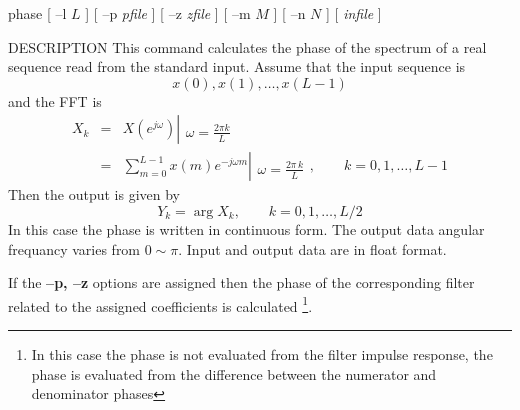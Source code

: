 
\begin{synopsis}
\item[phase] [ --l $L$ ] [ --p {\em pfile} ] [ --z {\em zfile} ]
             [ --m $M$ ] [ --n $N$ ] [ {\em infile} ]
\end{synopsis}

\begin{qsection}{DESCRIPTION}
This command calculates the phase of the spectrum of a real sequence read
from the standard input.
Assume that the input sequence is
\begin{displaymath}
  x(0), x(1), \ldots, x(L-1)
\end{displaymath}
and the FFT is
\begin{eqnarray*}
  X_k &=& X(e^{j\omega}) \left|
	\begin{array}{c}
	\\
        \omega=\frac{2\pi k}{L}
	\end{array}
    \right. \nonumber \\
         &=& \sum_{m=0}^{L-1}x(m)e^{-j\omega m} \left|
	\begin{array}{c}
	\\
        \omega=\frac{2\pi\, k}{L}
	\end{array}
    \right.,\qquad k=0,1,\ldots,L-1
\end{eqnarray*}
Then the output is given by
\begin{displaymath}
  Y_k=\arg X_k, \qquad k=0,1,\ldots,L/2
\end{displaymath}
In this case the phase is written in continuous form.
The output data angular frequancy varies from $0\sim \pi$.
Input and output data are in float format.
\par
If the {\bf --p, --z} options are assigned
then the phase of the corresponding filter related to
the assigned coefficients is calculated
\footnote{
In this case the phase is not evaluated from the filter
impulse response, the phase is evaluated from
the difference between the numerator and denominator phases}.
\end{qsection}

